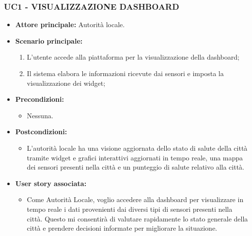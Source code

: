 \subsubsection{UC1 - VISUALIZZAZIONE DASHBOARD}
\begin{itemize}
    \item \textbf{Attore principale:} Autorità locale.
    \item \textbf{Scenario principale:}
          \begin{enumerate}
              \item L'utente accede alla piattaforma per la visualizzazione della dashboard;
              \item Il sistema elabora le informazioni ricevute dai sensori e imposta la visualizzazione dei widget;
          \end{enumerate}
    \item \textbf{Precondizioni:}
          \begin{itemize}
              \item Nessuna.
          \end{itemize}
    \item \textbf{Postcondizioni:}
          \begin{itemize}
              \item  L'autorità locale ha una visione aggiornata dello stato di salute della città tramite widget e grafici interattivi aggiornati in tempo reale, una mappa dei sensori presenti nella città e un punteggio di salute relativo alla città.
          \end{itemize}
    \item \textbf{User story associata:}
          \begin{itemize}
              \item Come Autorità Locale, voglio accedere alla dashboard per visualizzare in tempo reale i dati provenienti dai diversi tipi di sensori presenti nella città. Questo mi consentirà di valutare rapidamente lo stato generale della città e prendere decisioni informate per migliorare la situazione.
          \end{itemize}
\end{itemize}